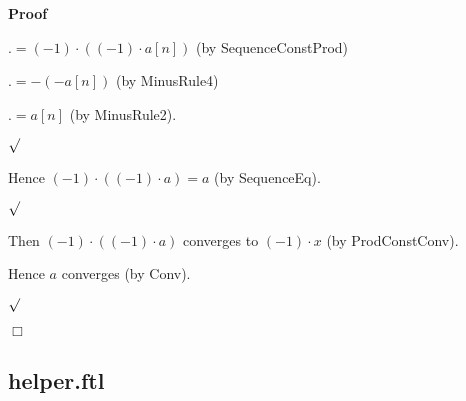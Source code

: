 \documentclass{article}
\newenvironment{forthel}{\begin{leftbar}}{\end{leftbar}}
\newenvironment{proof}{\noindent\textbf{Proof\ }}{\hspace*{\fill}$\Box$\medskip}
\newenvironment{subproof}{\begin{list}{}{}
		\item[\text{Proof}]}{\hfill $\surd$ \end{list}}
\newcommand{\cdottwo}{\cdot}
\begin{document}
\begin{forthel}
\begin{proof}
\begin{subproof}
\begin{subproof}
\begin{subproof}
					$.= (-1) \cdot ((-1) \cdot a[n])$ (by SequenceConstProd)
					
					$.= -(-a[n])$ (by MinusRule4)
					
					$.= a[n]$ (by MinusRule2).
										
				\end{subproof}
				
				Hence $(-1) \cdottwo ((-1) \cdottwo a) = a$ (by SequenceEq).
				
			\end{subproof}
			
			Then $(-1) \cdottwo ((-1) \cdottwo a)$ converges to $(-1) \cdot x$ (by ProdConstConv).
			
			Hence $a$ converges (by Conv).
			
		\end{subproof}
		
	\end{proof}


\end{forthel}

\subsection{helper.ftl}
\end{document}

